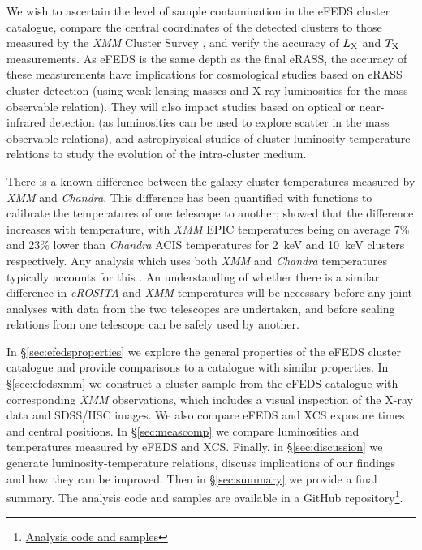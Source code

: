 \documentclass[fleqn,usenatbib]{mnras}
\begin{document}
We wish to ascertain the level of sample contamination in the eFEDS cluster catalogue, compare the central coordinates of the detected clusters to those measured by the {\em XMM} Cluster Survey \citep[XCS, ][]{xcsfoundation}, and verify the accuracy of $L_{\rm{X}}$ and $T_{\rm{X}}$ measurements. 
As eFEDS is the same depth as the final eRASS, the accuracy of these measurements have implications for cosmological studies based on eRASS cluster detection (using weak lensing masses and X-ray luminosities for the mass observable relation). They will also impact studies based on optical or near-infrared detection (as luminosities can be used to explore scatter in the mass observable relations), and astrophysical studies of cluster luminosity-temperature relations to study the evolution of the intra-cluster medium. 

There is a known difference between the galaxy cluster temperatures measured by {\em XMM} and {\em Chandra}. This difference has been quantified with functions to calibrate the temperatures of one telescope to another; \cite{xmmchandracal} showed that the difference increases with temperature, with {\em XMM} EPIC temperatures being on average 7\% and 23\% lower than {\em Chandra} ACIS temperatures for 2~keV and 10~keV clusters respectively. Any analysis which uses both {\em XMM} and {\em Chandra} temperatures typically accounts for this \citep[e.g.,][]{farahixmmchandra,mikgasxmmchandra}. An understanding of whether there is a similar difference in {\em eROSITA} and {\em XMM} temperatures will be necessary before any joint analyses with data from the two telescopes are undertaken, and before scaling relations from one telescope can be safely used by another. 

In \S\ref{sec:efedsproperties} we explore the general properties of the eFEDS cluster catalogue and provide comparisons to a catalogue with similar properties. In \S\ref{sec:efedsxmm} we construct a cluster sample from the eFEDS catalogue with corresponding {\em XMM} observations, which includes a visual inspection of the X-ray data and SDSS/HSC images. We also compare eFEDS and XCS exposure times and central positions. In \S\ref{sec:meascomp} we compare luminosities and temperatures measured by eFEDS and XCS. Finally, in \S\ref{sec:discussion} we generate luminosity-temperature relations, discuss implications of our findings and how they can be improved. Then in \S\ref{sec:summary} we provide a final summary. The analysis code and samples are available in a GitHub repository\footnote{\href{https://github.com/DavidT3/eFEDS-XCS-Paper}{Analysis code and samples}}.
\end{document}
